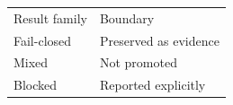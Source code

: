 \begin{tabular}{ll}Result family & Boundary \\ Fail-closed & Preserved as evidence \\ Mixed & Not promoted \\ Blocked & Reported explicitly \\\end{tabular}

